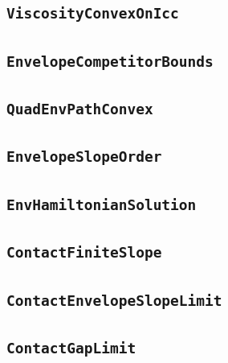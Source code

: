 \documentclass[11pt]{amsart}
\theoremstyle{definition}
\begin{document}
\subsection{\texorpdfstring{\texttt{ViscosityConvexOnIcc}}{ViscosityConvexOnIcc}}\label{node:ViscosityConvexOnIcc}


\subsection{\texorpdfstring{\texttt{EnvelopeCompetitorBounds}}{EnvelopeCompetitorBounds}}\label{node:EnvelopeCompetitorBounds}


\subsection{\texorpdfstring{\texttt{QuadEnvPathConvex}}{QuadEnvPathConvex}}\label{node:QuadEnvPathConvex}


\subsection{\texorpdfstring{\texttt{EnvelopeSlopeOrder}}{EnvelopeSlopeOrder}}\label{node:EnvelopeSlopeOrder}


\subsection{\texorpdfstring{\texttt{EnvHamiltonianSolution}}{EnvHamiltonianSolution}}\label{node:EnvHamiltonianSolution}


\subsection{\texorpdfstring{\texttt{ContactFiniteSlope}}{ContactFiniteSlope}}\label{node:ContactFiniteSlope}


\subsection{\texorpdfstring{\texttt{ContactEnvelopeSlopeLimit}}{ContactEnvelopeSlopeLimit}}\label{node:ContactEnvelopeSlopeLimit}


\subsection{\texorpdfstring{\texttt{ContactGapLimit}}{ContactGapLimit}}\label{node:ContactGapLimit}

\end{document}
